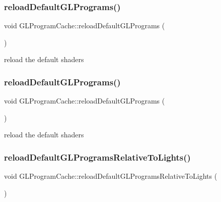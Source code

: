 \subsubsection{\texorpdfstring{reload\+Default\+G\+L\+Programs()}{reloadDefaultGLPrograms()}\hspace{0.1cm}{\footnotesize\ttfamily [1/2]}}
{\footnotesize\ttfamily void G\+L\+Program\+Cache\+::reload\+Default\+G\+L\+Programs (\begin{DoxyParamCaption}{ }\end{DoxyParamCaption})}

reload the default shaders \mbox{\label{classGLProgramCache_a8405ebabc9102acb46c6f17beae701f6}} 
\subsubsection{\texorpdfstring{reload\+Default\+G\+L\+Programs()}{reloadDefaultGLPrograms()}\hspace{0.1cm}{\footnotesize\ttfamily [2/2]}}
{\footnotesize\ttfamily void G\+L\+Program\+Cache\+::reload\+Default\+G\+L\+Programs (\begin{DoxyParamCaption}{ }\end{DoxyParamCaption})}

reload the default shaders \mbox{\label{classGLProgramCache_a8b95bc69d3474d3678e39d45a042c980}} 
\subsubsection{\texorpdfstring{reload\+Default\+G\+L\+Programs\+Relative\+To\+Lights()}{reloadDefaultGLProgramsRelativeToLights()}\hspace{0.1cm}{\footnotesize\ttfamily [1/2]}}
{\footnotesize\ttfamily void G\+L\+Program\+Cache\+::reload\+Default\+G\+L\+Programs\+Relative\+To\+Lights (\begin{DoxyParamCaption}{ }\end{DoxyParamCaption})}

